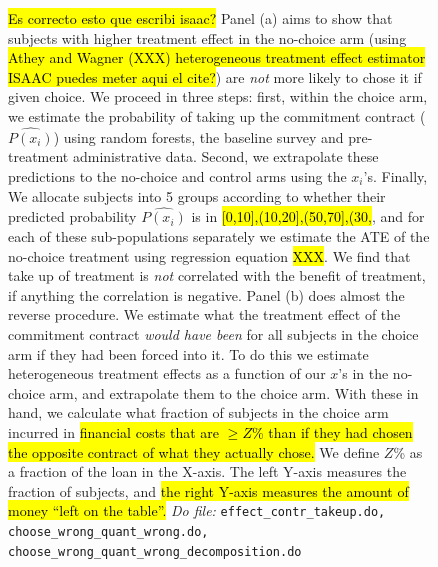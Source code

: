 \documentclass[11pt]{article}
\begin{document}
\begin{figure}[H]
\begin{center}
    \end{center}
        \scriptsize
        \hl{Es correcto esto que escribi isaac?} Panel (a) aims to show that subjects with higher  treatment effect in the no-choice arm (using \hl{Athey and Wagner (XXX) heterogeneous treatment effect estimator ISAAC puedes meter aqui el cite?}) are \textit{not} more likely to chose it if given choice. We proceed in three steps: first, within the choice arm, we estimate the probability of taking up the commitment contract ($\widehat{P(x_i)}$) using random forests, the baseline survey and pre-treatment administrative data. Second, we extrapolate these predictions to the no-choice and control arms using the $x_i$'s. Finally, We allocate subjects into 5 groups according to whether their predicted probability $\widehat{P(x_i)}$ is in \hl{[0,10],(10,20],(50,70],(30,}, and for each of these sub-populations separately we estimate the ATE of the no-choice treatment using regression equation \hl{XXX}. We find that take up of treatment is \textit{not} correlated with the benefit of treatment, if anything the correlation is negative. Panel (b) does almost the reverse procedure. We estimate what the treatment effect of the commitment contract \textit{would have been} for all subjects in the choice arm if they had been forced into it. To do this we estimate heterogeneous treatment effects as a function of our $x$'s in the no-choice arm, and extrapolate them to the choice arm. With these in hand, we calculate what fraction of subjects in the choice arm incurred in \hl{financial costs that are  $\geq Z$\% than if they had chosen the opposite contract of what they actually chose.} We define $Z$\% as a fraction of the loan in the X-axis. The left Y-axis measures the fraction of subjects, and \hl{the right Y-axis measures the amount of money ``left on the table''.} 
        \textit{Do file: }  \texttt{effect\_contr\_takeup.do, choose\_wrong\_quant\_wrong.do, choose\_wrong\_quant\_wrong\_decomposition.do}
\end{figure}
\end{document}
